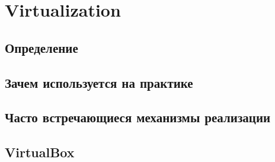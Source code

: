 \section{Virtualization}
\subsection{Определение}
\subsection{Зачем используется на практике}
\subsection{Часто встречающиеся механизмы реализации}
\subsection{VirtualBox}
\newpage
